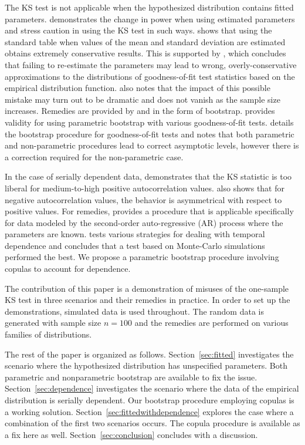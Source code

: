 \documentclass[12pt, letterpaper, titlepage]{article}
\begin{document}
The KS test is not applicable when the hypothesized distribution contains fitted
parameters. \citet{Steinskog} demonstrates the change in power when using 
estimated parameters and stress caution in using the KS test in such ways. 
\citet{Lilliefors} shows that using the standard table when values of the mean 
and standard deviation are estimated obtains extremely conservative results. 
This is supported by \citet{Capasso}, which concludes that failing to 
re-estimate the parameters may lead to wrong, overly-conservative approximations 
to the distributions of goodness-of-fit test statistics based on the empirical 
distribution function. \citet{Capasso} also notes that the impact of this 
possible mistake may turn out to be dramatic and does not vanish as the sample 
size increases. Remedies are provided by \citet{Genest} and \citet{Babu} in the 
form of bootstrap. \citet{Genest} provides validity for using parametric 
bootstrap with various goodness-of-fit tests. \citet{Babu} details the bootstrap
procedure for goodness-of-fit tests and notes that both parametric and 
non-parametric procedures lead to correct asymptotic levels, however there 
is a correction required for the non-parametric case. 

In the case of serially dependent data, \citet{Durilleul} demonstrates that the 
KS statistic is too liberal for medium-to-high positive autocorrelation values. 
\citet{Durilleul} also shows that for negative autocorrelation values, the 
behavior is asymmetrical with respect to positive values. For remedies, 
\citet{Weiss} provides a procedure that is applicable specifically for data 
modeled by the second-order auto-regressive (AR) process where the parameters 
are known. \citet{Lanzante} tests various strategies for dealing with temporal 
dependence and concludes that a test based on Monte-Carlo simulations performed 
the best. We propose a parametric bootstrap procedure involving copulas to 
account for dependence.

The contribution of this paper is a demonstration of misuses of the one-sample
KS test in three scenarios and their remedies in practice. In order to set 
up the demonstrations, simulated data is used throughout. The random data is 
generated with sample size $n = 100$ and the remedies are performed on various
families of distributions.

The rest of the paper is organized as follows. Section~\ref{sec:fitted}
investigates the scenario where the hypothesized distribution has unspecified
parameters. Both parametric and nonparametric bootstrap are available to fix the
issue. Section~\ref{sec:dependence} investigates the scenario where the data of 
the empirical distribution is serially dependent. Our bootstrap procedure 
employing copulas is a working solution. Section~\ref{sec:fittedwithdependence}
explores the case where a combination of the first two scenarios occurs. The 
copula procedure is available as a fix here as well. 
Section~\ref{sec:conclusion} concludes with a discussion.
\end{document}
